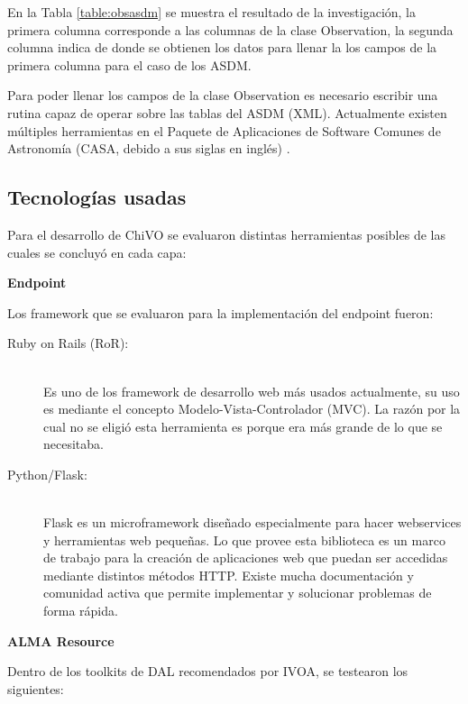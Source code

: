 En la Tabla \ref{table:obsasdm} se muestra el resultado de la investigación, la primera
columna corresponde a las columnas de la clase Observation, la segunda columna
indica de donde se obtienen los datos para llenar la los campos de la primera
columna para el caso de los ASDM.

Para poder llenar los campos de la clase Observation es necesario escribir una
rutina capaz de operar sobre las tablas del ASDM (XML).
Actualmente existen múltiples herramientas en el Paquete de Aplicaciones de Software
Comunes de Astronomía (CASA, debido a sus siglas en inglés) \cite{petry2012analysing}.

\subsection{Tecnologías usadas}

Para el desarrollo de ChiVO se evaluaron distintas herramientas posibles de las
cuales se concluyó en cada capa:

\textbf{Endpoint}

Los framework que se evaluaron para la implementación del endpoint fueron:

\begin{description}
    \item[Ruby on Rails (RoR):] \hfill \\
        Es uno de los framework de desarrollo web más usados actualmente, su uso es
        mediante el concepto Modelo-Vista-Controlador (MVC).
        La razón por la cual no se eligió esta herramienta es porque era más grande
        de lo que se necesitaba.
    \item[Python/Flask:] \hfill \\
        Flask es un microframework diseñado especialmente para hacer webservices y
        herramientas web pequeñas.
        Lo que provee esta biblioteca es un marco de trabajo para la creación de
        aplicaciones web que puedan ser accedidas mediante distintos métodos HTTP.
        Existe mucha documentación y comunidad activa que permite implementar y
        solucionar problemas de forma rápida.
\end{description}

\textbf{ALMA Resource}

Dentro de los toolkits de DAL recomendados por IVOA, se testearon los siguientes:

